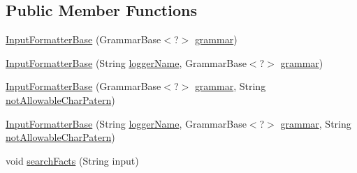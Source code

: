 \subsection*{Public Member Functions}
\begin{DoxyCompactItemize}
\item 
\hyperlink{classit_1_1emarolab_1_1cagg_1_1core_1_1evaluation_1_1inputFormatting_1_1InputFormatterBase_aa2a7f7cabf0b9aaba23b2e7a311781ae}{Input\-Formatter\-Base} (Grammar\-Base$<$?$>$ \hyperlink{classit_1_1emarolab_1_1cagg_1_1core_1_1evaluation_1_1inputFormatting_1_1InputFormatterBase_a3de6c039296a18f821706f1b8e0cb2a5}{grammar})
\item 
\hyperlink{classit_1_1emarolab_1_1cagg_1_1core_1_1evaluation_1_1inputFormatting_1_1InputFormatterBase_a2cbf8350afdbf232fa3d76108873b140}{Input\-Formatter\-Base} (String \hyperlink{classit_1_1emarolab_1_1cagg_1_1core_1_1evaluation_1_1inputFormatting_1_1InputFormatterBase_a056ceacafad1bfa504e41694d410b6e7}{logger\-Name}, Grammar\-Base$<$?$>$ \hyperlink{classit_1_1emarolab_1_1cagg_1_1core_1_1evaluation_1_1inputFormatting_1_1InputFormatterBase_a3de6c039296a18f821706f1b8e0cb2a5}{grammar})
\item 
\hyperlink{classit_1_1emarolab_1_1cagg_1_1core_1_1evaluation_1_1inputFormatting_1_1InputFormatterBase_a4bffdc987a030acdbd43386dc9fbf01f}{Input\-Formatter\-Base} (Grammar\-Base$<$?$>$ \hyperlink{classit_1_1emarolab_1_1cagg_1_1core_1_1evaluation_1_1inputFormatting_1_1InputFormatterBase_a3de6c039296a18f821706f1b8e0cb2a5}{grammar}, String \hyperlink{classit_1_1emarolab_1_1cagg_1_1core_1_1evaluation_1_1inputFormatting_1_1InputFormatterBase_af8c1c79313632272c67711704784ef13}{not\-Allowable\-Char\-Patern})
\item 
\hyperlink{classit_1_1emarolab_1_1cagg_1_1core_1_1evaluation_1_1inputFormatting_1_1InputFormatterBase_a240c685c690f290228d8b79530e78754}{Input\-Formatter\-Base} (String \hyperlink{classit_1_1emarolab_1_1cagg_1_1core_1_1evaluation_1_1inputFormatting_1_1InputFormatterBase_a056ceacafad1bfa504e41694d410b6e7}{logger\-Name}, Grammar\-Base$<$?$>$ \hyperlink{classit_1_1emarolab_1_1cagg_1_1core_1_1evaluation_1_1inputFormatting_1_1InputFormatterBase_a3de6c039296a18f821706f1b8e0cb2a5}{grammar}, String \hyperlink{classit_1_1emarolab_1_1cagg_1_1core_1_1evaluation_1_1inputFormatting_1_1InputFormatterBase_af8c1c79313632272c67711704784ef13}{not\-Allowable\-Char\-Patern})
\item 
void \hyperlink{classit_1_1emarolab_1_1cagg_1_1core_1_1evaluation_1_1inputFormatting_1_1InputFormatterBase_a5d4a05cd56b9cf029c3a6c31ddeed8d0}{search\-Facts} (String input)

\end{DoxyCompactItemize}
